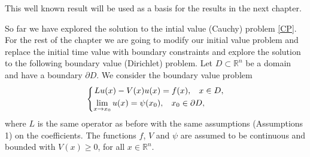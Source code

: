\documentclass[a4paper,12pt,draft]{report}
\begin{document}
This well known result will be used as a basis for the results in the next chapter.

So far we have explored the solution to the intial value (Cauchy) problem \eqref{CP}.  For the rest of the chapter we are going to modify our initial value problem and replace the initial time value with boundary constraints and explore the solution to the following boundary value (Dirichlet) problem.  Let $D \subset \mathbb{R}^n$ be a domain and have a boundary $\partial D$.  We consider the boundary value problem
\begin{equation}
\left\{
\begin{aligned}
 Lu(x) - V(x)u(x) & = f(x), \hspace{0.3cm} x \in D,\\ 
\lim_{x \to x_0}u(x) = \psi(x_0) & , \hspace{0.3cm} x_0 \in \partial D, \label{DP}
\end{aligned}
\right.
\end{equation}
where $L$ is the same operator as before with the same assumptions (Assumptions 1) on the coefficients.  The functions $f$, $V$ and $\psi$ are assumed to be continuous and bounded with $V(x) \ge 0$, for all $x \in \mathbb{R}^n$.
\end{document}
